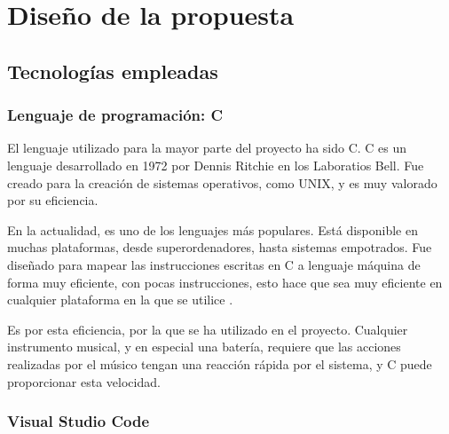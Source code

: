 
\chapter{Diseño de la propuesta} %
\label{cha:Diseno}


    \section{Tecnologías empleadas} %
    \label{sec:TecnologiasEmpleadas}

        \subsection{Lenguaje de programación: C} %
        \label{sub:CLanguage}

            El lenguaje utilizado para la mayor parte del proyecto ha sido C. C es un lenguaje desarrollado en 1972 por
            Dennis Ritchie en los Laboratios Bell. Fue creado para la creación de sistemas operativos, como UNIX, y es
            muy valorado por su eficiencia.

            En la actualidad, es uno de los lenguajes más populares. Está disponible en muchas plataformas, desde
            superordenadores, hasta sistemas empotrados. Fue diseñado para mapear las instrucciones escritas en C a
            lenguaje máquina de forma muy eficiente, con pocas instrucciones, esto hace que sea muy eficiente en
            cualquier plataforma en la que se utilice \cite{wikipedia_c_language}.

            Es por esta eficiencia, por la que se ha utilizado en el proyecto. Cualquier instrumento musical, y en
            especial una batería, requiere que las acciones realizadas por el músico tengan una reacción rápida por el
            sistema, y C puede proporcionar esta velocidad.


        \subsection{Visual Studio Code} %
        \label{sub:VisualStudioCode}

